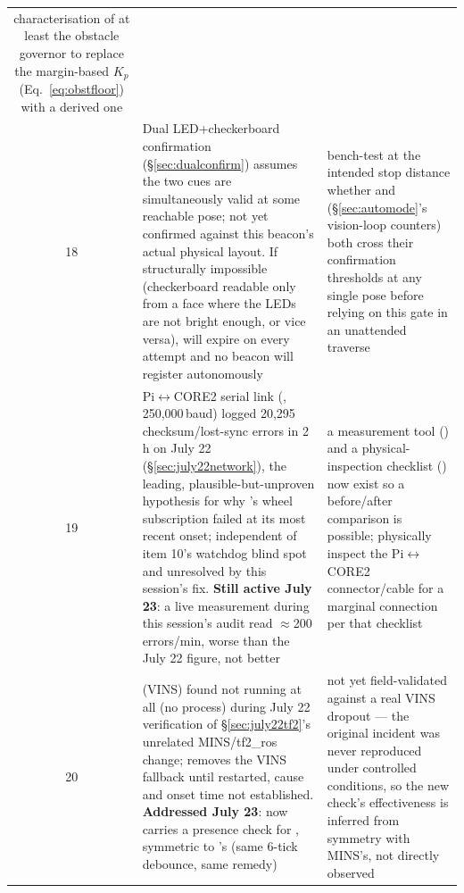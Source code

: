 \begin{longtable}{@{}cL{6.2cm}L{6.8cm}@{}}
    characterisation of at least the obstacle governor to replace the
    margin-based $K_p$ (Eq.~\ref{eq:obstfloor}) with a derived one \\
18 & Dual LED+checkerboard confirmation (\S\ref{sec:dualconfirm}) assumes
    the two cues are simultaneously valid at some reachable pose; not yet
    confirmed against this beacon's actual physical layout. If structurally
    impossible (checkerboard readable only from a face where the LEDs are
    not bright enough, or vice versa),  will
    expire on every attempt and no beacon will register autonomously &
    bench-test at the intended stop distance whether  and
     (\S\ref{sec:automode}'s vision-loop counters) both cross
    their confirmation thresholds at any single pose before relying on this
    gate in an unattended traverse \\
19 & Pi$\leftrightarrow$CORE2 serial link (,
    250{,}000\,baud) logged 20{,}295 checksum/lost-sync errors in 2\,h on
    July 22 (\S\ref{sec:july22network}), the leading, plausible-but-unproven
    hypothesis for why 's wheel
    subscription failed at its most recent onset; independent of item 10's
    watchdog blind spot and unresolved by this session's fix. \textbf{Still
    active July 23}: a live measurement during this session's audit read
    $\approx$200 errors/min, worse than the July 22 figure, not better &
    a measurement tool () and a
    physical-inspection checklist ()
    now exist so a before/after comparison is possible; physically inspect
    the Pi$\leftrightarrow$CORE2 connector/cable for a marginal connection
    per that checklist \\
20 &  (VINS) found not running at all (no process) during
    July 22 verification of \S\ref{sec:july22tf2}'s unrelated MINS/tf2\_ros
    change; removes the VINS fallback until restarted, cause and onset time
    not established. \textbf{Addressed July 23}:  now
    carries a presence check for , symmetric to
    's (same 6-tick debounce, same
     remedy) &
    not yet field-validated against a real VINS dropout — the original
    incident was never reproduced under controlled conditions, so the new
    check's effectiveness is inferred from symmetry with MINS's, not
    directly observed \\

\end{longtable}

